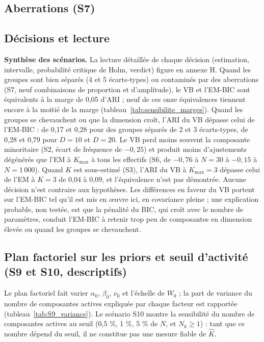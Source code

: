 \subsection{Aberrations (S7)}\label{sec:res_s7}

\subsection{Décisions et lecture}\label{sec:decisions_et_lecture}
\textbf{Synthèse des scénarios.} La lecture détaillée de chaque décision (estimation, intervalle, probabilité critique de Holm, verdict) figure en annexe H. Quand les groupes sont bien séparés (4 et 5 écarts-types) ou contaminés par des aberrations (S7, neuf combinaisons de proportion et d'amplitude), le VB et l'EM-BIC sont équivalents à la marge de 0,05 d'ARI ; neuf de ces onze équivalences tiennent encore à la moitié de la marge (tableau~\ref{tab:sensibilite_marges}). Quand les groupes se chevauchent ou que la dimension croît, l'ARI du VB dépasse celui de l'EM-BIC : de 0,17 et 0,28 pour des groupes séparés de 2 et 3 écarts-types, de 0,28 et 0,79 pour $D = 10$ et $D = 20$. Le VB perd moins souvent la composante minoritaire (S2, écart de fréquence de $-0{,}25$) et produit moins d'ajustements dégénérés que l'EM à $K_{\max}$ à tous les effectifs (S6, de $-0{,}76$ à $N = 30$ à $-0{,}15$ à $N = 1\,000$). Quand $K$ est sous-estimé (S3), l'ARI du VB à $K_{\max} = 3$ dépasse celui de l'EM à $K = 3$ de 0,04 à 0,09, et l'équivalence n'est pas démontrée. Aucune décision n'est contraire aux hypothèses. Les différences en faveur du VB portent sur l'EM-BIC tel qu'il est mis en œuvre ici, en covariance pleine ; une explication probable, non testée, est que la pénalité du BIC, qui croît avec le nombre de paramètres, conduit l'EM-BIC à retenir trop peu de composantes en dimension élevée ou quand les groupes se chevauchent.

\subsection{Plan factoriel sur les priors et seuil d'activité (S9 et S10, descriptifs)}\label{sec:res_s9s10}
Le plan factoriel fait varier $\alpha_0$, $\beta_0$, $\nu_0$ et l'échelle de $W_0$ ; la part de variance du nombre de composantes actives expliquée par chaque facteur est rapportée (tableau~\ref{tab:S9_variance}). Le scénario S10 montre la sensibilité du nombre de composantes actives au seuil (0,5 \%, 1 \%, 5 \% de $N$, et $N_k \geq 1$) : tant que ce nombre dépend du seuil, il ne constitue pas une mesure fiable de $\hat K$.

